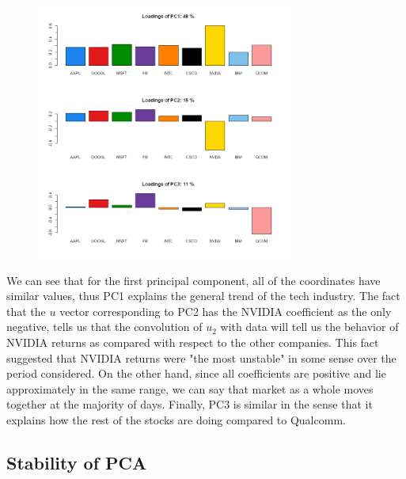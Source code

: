 \documentclass{article}
\begin{document}
\begin{figure}[!ht]
\caption{}
\centering
\includegraphics[width=0.75\textwidth]{PCload.png}
\label{techloadings}
\end{figure}


We can see that for the first principal component, all of the coordinates have similar values, thus PC1 explains the general trend of the tech industry.  The fact that the  $u$ vector corresponding to PC2 has the NVIDIA coefficient as the only negative, tells us that the convolution of $u_2$ with data will tell us the behavior of NVIDIA returns as compared with respect to the other companies. This fact suggested that NVIDIA returns were "the most unstable" in some sense over the period considered. On the other hand, since all coefficients are positive and lie approximately in the same range, we can say that market as a whole moves together at the majority of days. Finally, PC3 is similar in the sense that it explains how the rest of the stocks are doing compared to Qualcomm.



\subsection{Stability of PCA}
\end{document}
